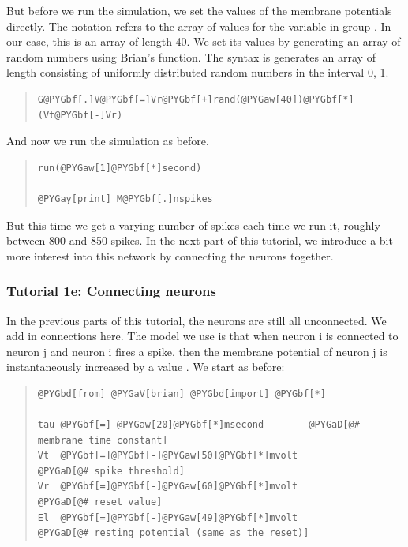 \documentclass[letterpaper,10pt,english]{manual}
\begin{document}
But before we run the simulation, we set the values of the
membrane potentials directly. The notation  refers
to the array of values for the variable  in group . In
our case, this is an array of length 40. We set its values
by generating an array of random numbers using Brian's
 function. The syntax is  generates an
array of length  consisting of uniformly distributed
random numbers in the interval 0, 1.
\begin{quote}

\begin{Verbatim}[commandchars=@\[\]]
G@PYGbf[.]V@PYGbf[=]Vr@PYGbf[+]rand(@PYGaw[40])@PYGbf[*](Vt@PYGbf[-]Vr)
\end{Verbatim}
\end{quote}

And now we run the simulation as before.
\begin{quote}

\begin{Verbatim}[commandchars=@\[\]]
run(@PYGaw[1]@PYGbf[*]second)

@PYGay[print] M@PYGbf[.]nspikes
\end{Verbatim}
\end{quote}

But this time we get a varying number of spikes each time
we run it, roughly between 800 and 850 spikes. In the
next part of this tutorial, we introduce a bit more
interest into this network by connecting the neurons together.

\resetcurrentobjects
\hypertarget{--doc-tutorial_1e_connecting_neurons}{}

\subsubsection{Tutorial 1e: Connecting neurons}

In the previous parts of this tutorial, the neurons are
still all unconnected. We add in connections here. The
model we use is that when neuron i is connected to
neuron j and neuron i fires a spike, then the membrane
potential of neuron j is instantaneously increased by
a value . We start as before:
\begin{quote}

\begin{Verbatim}[commandchars=@\[\]]
@PYGbd[from] @PYGaV[brian] @PYGbd[import] @PYGbf[*]

tau @PYGbf[=] @PYGaw[20]@PYGbf[*]msecond        @PYGaD[@# membrane time constant]
Vt  @PYGbf[=]@PYGbf[-]@PYGaw[50]@PYGbf[*]mvolt          @PYGaD[@# spike threshold]
Vr  @PYGbf[=]@PYGbf[-]@PYGaw[60]@PYGbf[*]mvolt          @PYGaD[@# reset value]
El  @PYGbf[=]@PYGbf[-]@PYGaw[49]@PYGbf[*]mvolt          @PYGaD[@# resting potential (same as the reset)]
\end{Verbatim}
\end{quote}
\end{document}
